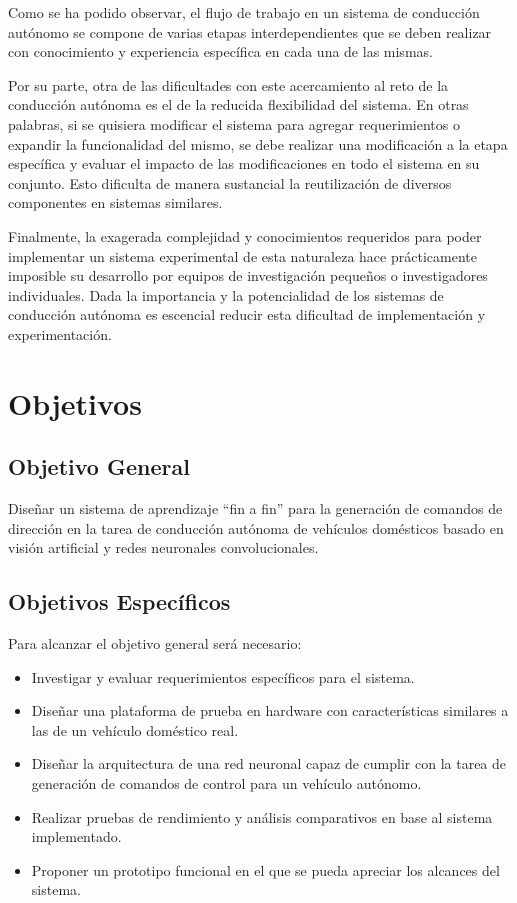 \documentclass[12pt,letterpaper]{article}
\begin{document}
Como se ha podido observar, el flujo de trabajo en un sistema de conducción autónomo se compone de varias etapas 
interdependientes que se deben realizar con conocimiento y experiencia específica en cada una de las mismas. 

Por su parte, otra de las dificultades con este acercamiento al reto de la conducción autónoma es el de la reducida
flexibilidad del sistema. En otras palabras, si se quisiera modificar el sistema para agregar requerimientos o 
expandir la funcionalidad del mismo, se debe realizar una modificación a la etapa específica y evaluar el impacto de 
las modificaciones en todo el sistema en su conjunto. Esto dificulta de manera sustancial la reutilización de diversos
componentes en sistemas similares.

Finalmente, la exagerada complejidad y conocimientos requeridos para poder implementar un sistema experimental 
de esta naturaleza hace prácticamente imposible su desarrollo por equipos de investigación pequeños o investigadores 
individuales. Dada la importancia y la potencialidad de los sistemas de conducción autónoma es escencial reducir 
esta dificultad de implementación y experimentación.

\section{Objetivos}
\subsection{Objetivo General}

Diseñar un sistema de aprendizaje “fin a fin” para la generación de comandos de 
dirección en la tarea de conducción autónoma de vehículos domésticos basado en 
visión artificial y redes neuronales convolucionales.

\subsection{Objetivos Específicos}
Para alcanzar el objetivo general será necesario:

\begin{itemize}
    \item Investigar y evaluar requerimientos específicos para el sistema.
    \item Diseñar una plataforma de prueba en hardware con características similares a las de un vehículo doméstico real.
    \item Diseñar la arquitectura de una red neuronal capaz de cumplir con la tarea de generación de comandos 
    de control para un vehículo autónomo.
    \item Realizar pruebas de rendimiento y análisis comparativos en base al sistema implementado.
    \item Proponer un prototipo funcional en el que se pueda apreciar los alcances del sistema.
\end{itemize}
\end{document}
